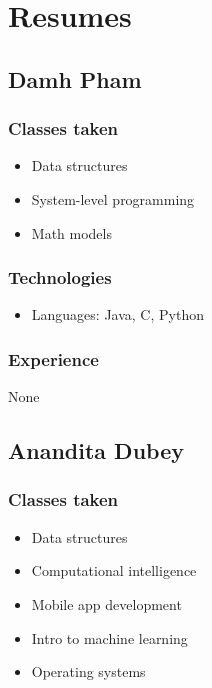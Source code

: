 \documentclass[
10pt, %
a4paper, %
oneside, %
headinclude,footinclude, %
BCOR5mm, %
]{scrartcl}
\begin{document}
\section{Resumes}

\subsection{Damh Pham}

\subsubsection{Classes taken}

\begin{itemize}
\item
  Data structures
\item
  System-level programming
\item
  Math models
\end{itemize}

\subsubsection{Technologies}

\begin{itemize}
\item
  Languages: Java, C, Python
\end{itemize}

\subsubsection{Experience}

None

\subsection{Anandita Dubey}

\subsubsection{Classes taken}

\begin{itemize}
\item
  Data structures
\item
  Computational intelligence
\item
  Mobile app development
\item
  Intro to machine learning
\item
  Operating systems
\end{itemize}
\end{document}
